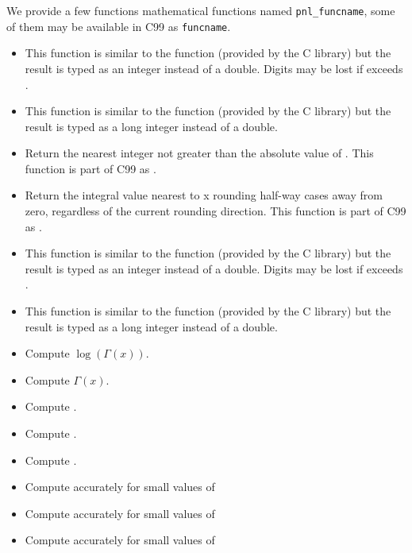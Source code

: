 We provide a few functions mathematical functions named \verb+pnl_funcname+,
some of them may be available in C99 as \verb+funcname+.
\begin{itemize}
  \item {}
    \sshortdescribe This function is similar to the  function
    (provided by the C library) but the result is typed as an integer instead of a
    double. Digits may be lost if  exceeds .
  \item {}
    \sshortdescribe This function is similar to the  function
    (provided by the C library) but the result is typed as a long integer instead of a
    double. 
  \item {}
    \sshortdescribe Return the nearest integer not greater than the absolute
    value of . This function is part of C99 as .
  \item {}
    \sshortdescribe Return the integral value nearest to x rounding
    half-way cases away from zero, regardless of the current rounding
    direction. This function is part of C99 as .
  \item {}
    \sshortdescribe This function is similar to the  function
    (provided by the C library) but the result is typed as an integer instead of a
    double. Digits may be lost if  exceeds .
  \item {}
    \sshortdescribe This function is similar to the  function
    (provided by the C library) but the result is typed as a long integer instead of a
    double. 
  \item {}
    \sshortdescribe Compute $\log(\Gamma(x))$.
  \item {}
    \sshortdescribe Compute $\Gamma(x)$.
  \item {}
    \sshortdescribe Compute .
  \item {}
    \sshortdescribe Compute .
  \item {}
    \sshortdescribe Compute .
  \item {}
    \sshortdescribe Compute  accurately for small values of 
  \item {}
    \sshortdescribe Compute  accurately for small values of 
  \item {}
    \sshortdescribe Compute  accurately for small values of 
\end{itemize}

